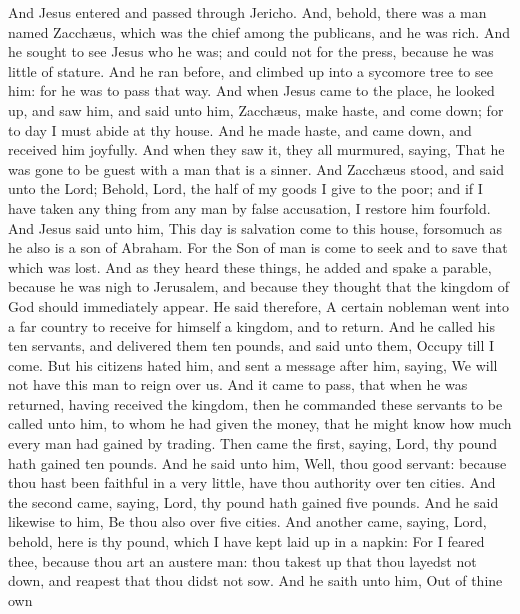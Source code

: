  And Jesus entered and passed through Jericho. 
And, behold, there was a man named Zacchæus, which was the chief among
the publicans, and he was rich.  And he sought to see Jesus
who he was; and could not for the press, because he was little of
stature.  And he ran before, and climbed up into a sycomore
tree to see him: for he was to pass that way.  And when
Jesus came to the place, he looked up, and saw him, and said unto him,
Zacchæus, make haste, and come down; for to day I must abide at thy
house.  And he made haste, and came down, and received him
joyfully.  And when they saw it, they all murmured, saying,
That he was gone to be guest with a man that is a sinner. 
And Zacchæus stood, and said unto the Lord; Behold, Lord, the half of my
goods I give to the poor; and if I have taken any thing from any man by
false accusation, I restore him fourfold.  And Jesus said
unto him, This day is salvation come to this house, forsomuch as he also
is a son of Abraham.  For the Son of man is come to seek
and to save that which was lost.  And as they heard these
things, he added and spake a parable, because he was nigh to Jerusalem,
and because they thought that the kingdom of God should immediately
appear.  He said therefore, A certain nobleman went into a
far country to receive for himself a kingdom, and to return.
 And he called his ten servants, and delivered them ten
pounds, and said unto them, Occupy till I come.  But his
citizens hated him, and sent a message after him, saying, We will not
have this man to reign over us.  And it came to pass, that
when he was returned, having received the kingdom, then he commanded
these servants to be called unto him, to whom he had given the money,
that he might know how much every man had gained by trading.
 Then came the first, saying, Lord, thy pound hath gained
ten pounds.  And he said unto him, Well, thou good servant:
because thou hast been faithful in a very little, have thou authority
over ten cities.  And the second came, saying, Lord, thy
pound hath gained five pounds.  And he said likewise to
him, Be thou also over five cities.  And another came,
saying, Lord, behold, here is thy pound, which I have kept laid up in a
napkin:  For I feared thee, because thou art an austere
man: thou takest up that thou layedst not down, and reapest that thou
didst not sow.  And he saith unto him, Out of thine own
